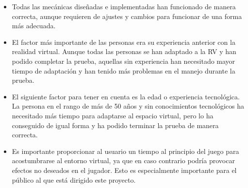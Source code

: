 \begin{itemize}
{\begin{itemize}
    
\item{Todas las mecánicas diseñadas e implementadas han funcionado de manera correcta, aunque requieren de ajustes y cambios para funcionar de una forma más adecuada.}
\item{El factor más importante de las personas era su experiencia anterior con la realidad virtual. Aunque todas las personas se han adaptado a la RV y han podido completar la prueba, aquellas sin experiencia han necesitado mayor tiempo de adaptación y han tenido más problemas en el manejo durante la prueba.}
\item{El siguiente factor para tener en cuenta es la edad o experiencia tecnológica. La persona en el rango de más de 50 años y sin conocimientos tecnológicos ha necesitado más tiempo para adaptarse al espacio virtual, pero lo ha conseguido de igual forma y ha podido terminar la prueba de manera correcta.}
\item{Es importante proporcionar al usuario un tiempo al principio del juego para acostumbrarse al entorno virtual, ya que en caso contrario podría provocar efectos no deseados en el jugador. Esto es especialmente importante para el público al que está dirigido este proyecto.}
    \end{itemize}
    }
\end{itemize}


